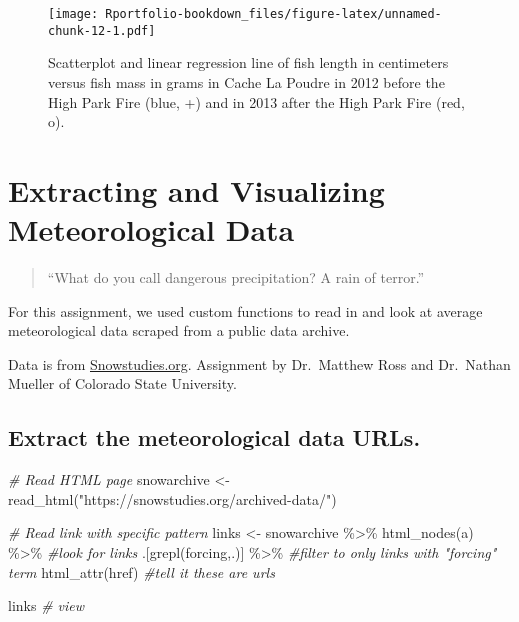\documentclass[
]{book}
\newenvironment{Shaded}{\begin{snugshade}}{\end{snugshade}}
\newcommand{\CommentTok}[1]{\textcolor[rgb]{0.56,0.35,0.01}{\textit{#1}}}
\newcommand{\FunctionTok}[1]{\textcolor[rgb]{0.00,0.00,0.00}{#1}}
\newcommand{\NormalTok}[1]{#1}
\newcommand{\OtherTok}[1]{\textcolor[rgb]{0.56,0.35,0.01}{#1}}
\newcommand{\SpecialCharTok}[1]{\textcolor[rgb]{0.00,0.00,0.00}{#1}}
\newcommand{\StringTok}[1]{\textcolor[rgb]{0.31,0.60,0.02}{#1}}
\begin{document}
\begin{figure}
\centering
\texttt{[image: Rportfolio-bookdown\_files/figure-latex/unnamed-chunk-12-1.pdf]}
\caption{\label{fig:unnamed-chunk-12}Scatterplot and linear regression line of fish length in centimeters versus fish mass in grams in Cache La Poudre in 2012 before the High Park Fire (blue, +) and in 2013 after the High Park Fire (red, o).}
\end{figure}

\hypertarget{extracting-and-visualizing-meteorological-data}{%
\chapter{Extracting and Visualizing Meteorological Data}\label{extracting-and-visualizing-meteorological-data}}

\begin{quote}
``What do you call dangerous precipitation? A rain of terror.''
\end{quote}

For this assignment, we used custom functions to read in and look at average meteorological data scraped from a public data archive.

Data is from \href{https://snowstudies.org/archived-data/}{Snowstudies.org}. Assignment by Dr.~Matthew Ross and Dr.~Nathan Mueller of Colorado State University.

\hypertarget{extract-the-meteorological-data-urls.}{%
\section{Extract the meteorological data URLs.}\label{extract-the-meteorological-data-urls.}}

\begin{Shaded}
\begin{Highlighting}[]
\CommentTok{\# Read HTML page }
\NormalTok{snowarchive }\OtherTok{\textless{}{-}} \FunctionTok{read\_html}\NormalTok{(}\StringTok{"https://snowstudies.org/archived{-}data/"}\NormalTok{)}

\CommentTok{\# Read link with specific pattern}
\NormalTok{links }\OtherTok{\textless{}{-}}\NormalTok{ snowarchive }\SpecialCharTok{\%\textgreater{}\%}
  \FunctionTok{html\_nodes}\NormalTok{(}\StringTok{\textquotesingle{}a\textquotesingle{}}\NormalTok{) }\SpecialCharTok{\%\textgreater{}\%} \CommentTok{\#look for links}
\NormalTok{  .[}\FunctionTok{grepl}\NormalTok{(}\StringTok{\textquotesingle{}forcing\textquotesingle{}}\NormalTok{,.)] }\SpecialCharTok{\%\textgreater{}\%} \CommentTok{\#filter to only links with "forcing" term}
  \FunctionTok{html\_attr}\NormalTok{(}\StringTok{\textquotesingle{}href\textquotesingle{}}\NormalTok{) }\CommentTok{\#tell it these are urls}

\NormalTok{links }\CommentTok{\# view}
\end{Highlighting}
\end{Shaded}
\end{document}
